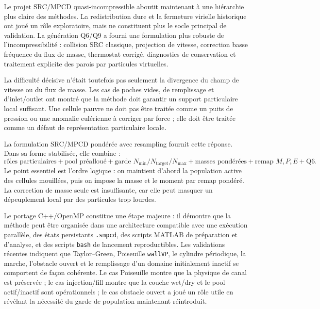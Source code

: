 \documentclass[11pt,a4paper]{article}
\begin{document}
Le projet SRC/MPCD quasi-incompressible aboutit maintenant à une hiérarchie plus claire des méthodes. La redistribution dure et la fermeture virielle historique ont joué un rôle exploratoire, mais ne constituent plus le socle principal de validation. La génération Q6/Q9 a fourni une formulation plus robuste de l'incompressibilité : collision SRC classique, projection de vitesse, correction basse fréquence du flux de masse, thermostat corrigé, diagnostics de conservation et traitement explicite des parois par particules virtuelles.

La difficulté décisive n'était toutefois pas seulement la divergence du champ de vitesse ou du flux de masse. Les cas de poches vides, de remplissage et d'inlet/outlet ont montré que la méthode doit garantir un support particulaire local suffisant. Une cellule pauvre ne doit pas être traitée comme un puits de pression ou une anomalie eulérienne à corriger par force ; elle doit être traitée comme un défaut de représentation particulaire locale.

La formulation SRC/MPCD pondérée avec resampling fournit cette réponse. Dans sa forme stabilisée, elle combine :
\begin{equation}
  \text{rôles particulaires}
  + \text{pool préalloué}
  + \text{garde }N_{\min}/N_{\mathrm{target}}/N_{\max}
  + \text{masses pondérées}
  + \text{remap }M,P,E
  + \text{Q6}.
\end{equation}
Le point essentiel est l'ordre logique : on maintient d'abord la population active des cellules mouillées, puis on impose la masse et le moment par remap pondéré. La correction de masse seule est insuffisante, car elle peut masquer un dépeuplement local par des particules trop lourdes.

Le portage C++/OpenMP constitue une étape majeure : il démontre que la méthode peut être organisée dans une architecture compatible avec une exécution parallèle, des états persistants \texttt{.smpcd}, des scripts MATLAB de préparation et d'analyse, et des scripts \texttt{bash} de lancement reproductibles. Les validations récentes indiquent que Taylor--Green, Poiseuille \texttt{wallVP}, le cylindre périodique, la marche, l'obstacle ouvert et le remplissage d'un domaine initialement inactif se comportent de façon cohérente. Le cas Poiseuille montre que la physique de canal est préservée ; le cas injection/fill montre que la couche wet/dry et le pool actif/inactif sont opérationnels ; le cas obstacle ouvert a joué un rôle utile en révélant la nécessité du garde de population maintenant réintroduit.
\end{document}
